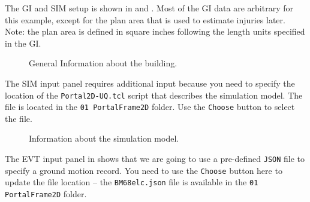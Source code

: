 The GI and SIM setup is shown in  and . Most of the GI data are arbitrary for this example, except for the plan area that is used to estimate injuries later. Note:  the plan area is defined in square inches following the length units specified in the GI.\\

\begin{figure}[!htbp]
  \caption{General Information about the building.}
  \label{fig:ex_1_GI}
\end{figure}

The SIM input panel requires additional input because you need to specify the location of the \texttt{Portal2D-UQ.tcl} script that describes the simulation model. The file is located in the \texttt{01 PortalFrame2D} folder. Use the \texttt{Choose} button to select the file.\\

\begin{figure}[!htbp]
  \caption{Information about the simulation model.}
  \label{fig:ex_1_SIM}
\end{figure}

The EVT input panel in  shows that we are going to use a pre-defined \texttt{JSON} file to specify a ground motion record. You need to use the \texttt{Choose} button here to update the file location – the \texttt{BM68elc.json} file is available in the \texttt{01 PortalFrame2D} folder.\\

